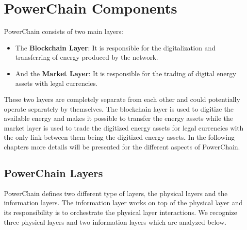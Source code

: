 \section{PowerChain Components}

PowerChain consists of two main layers:
\begin{itemize}
    \item The \textbf{Blockchain Layer}: It is responsible for the digitalization and transferring of energy produced by the network.
    \item And the \textbf{Market Layer}: It is responsible for the trading of digital energy assets with legal currencies.
\end{itemize}

These two layers are completely separate from each other and could potentially operate separately by themselves.
The blockchain layer is used to digitize the available energy and makes it possible to transfer the energy assets while the market layer is used to
trade the digitized energy assets for legal currencies with the only link between them being the digitized energy assets.
In the following chapters more details will be presented for the different aspects of PowerChain.

\pagebreak

\subsection{PowerChain Layers}
PowerChain defines two different type of layers, the physical layers and the information layers. The information layer works on top of the physical layer and its
responsibility is to orchestrate the physical layer interactions. We recognize three physical layers and two information layers which are analyzed below.\\


